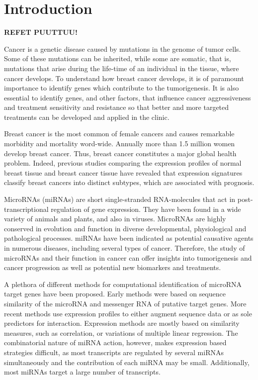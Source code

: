 
\section{Introduction}
\thispagestyle{empty}

\textbf{REFET PUUTTUU!}



Cancer is a genetic disease caused by mutations in the genome of tumor
cells. Some of these mutations can be inherited, while some are somatic, that
is, mutations that arise during the life-time of an individual in the tissue,
where cancer develops. To understand how breast cancer develops, it is of
paramount importance to identify genes which contribute to the tumorigenesis.
It is also essential to identify genes, and other factors, that influence
cancer aggressiveness and treatment sensitivity and resistance so that better and
more targeted treatments can be developed and applied in the clinic.

Breast cancer is the most common of female cancers and causes remarkable
morbidity and mortality word-wide. Annually more than 1.5 million women
develop breast cancer. Thus, breast cancer constitutes a major global health
problem. Indeed, previous studies comparing the expression profiles of normal breast
tissue and breast cancer tissue have revealed that expression signatures
classify breast cancers into distinct subtypes, which are associated with
prognosis.

MicroRNAs (miRNAs) are short single-stranded RNA-molecules that act in
post-transcriptional regulation of gene expression. They have been found in a
wide variety of animals and plants, and also in viruses. MicroRNAs are highly
conserved in evolution and function in diverse developmental, physiological
and pathological processes. miRNAs have been indicated as potential
causative agents in numerous diseases, including several types of cancer.
Therefore, the study of microRNAs and their function in cancer can offer
insights into tumorigenesis and cancer progression as well as potential new
biomarkers and treatments.

A plethora of different methods for computational identification of microRNA
target genes have been proposed. Early methods were based on sequence
similarity of the microRNA and messenger RNA of putative target genes. More
recent methods use expression profiles to either augment sequence data or as
sole predictors for interaction. Expression methods are mostly based on
similarity measures, such as correlation, or variations of multiple
linear regression. The combinatorial nature of miRNA action, however, makes
expression based strategies difficult, as most transcripts are regulated by
several miRNAs simultaneously and the contribution of each miRNA may
be small. Additionally, most miRNAs target a large number of transcripts.

